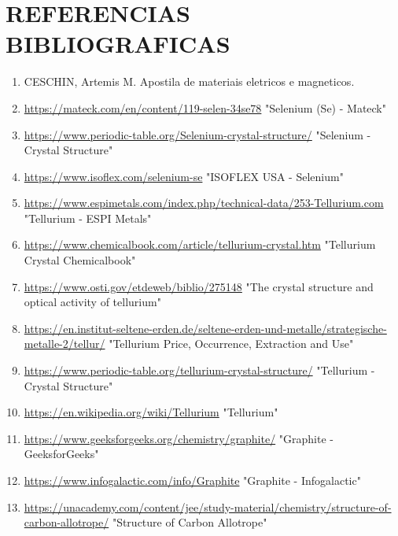 \documentclass[10pt,twocolumn,letterpaper]{article}
\begin{document}
\section{REFERENCIAS BIBLIOGRAFICAS}

\small
\begin{enumerate}
    \item CESCHIN, Artemis M. Apostila de materiais eletricos e magneticos.
    
    \item \url{https://mateck.com/en/content/119-selen-34se78} "Selenium (Se) - Mateck"
    
    \item \url{https://www.periodic-table.org/Selenium-crystal-structure/} "Selenium - Crystal Structure"
    
    \item \url{https://www.isoflex.com/selenium-se} "ISOFLEX USA - Selenium"
    
    \item \url{https://www.espimetals.com/index.php/technical-data/253-Tellurium.com} "Tellurium - ESPI Metals"
    
    \item \url{https://www.chemicalbook.com/article/tellurium-crystal.htm} "Tellurium Crystal Chemicalbook"
    
    \item \url{https://www.osti.gov/etdeweb/biblio/275148} "The crystal structure and optical activity of tellurium"
    
    \item \url{https://en.institut-seltene-erden.de/seltene-erden-und-metalle/strategische-metalle-2/tellur/} "Tellurium Price, Occurrence, Extraction and Use"
    
    \item \url{https://www.periodic-table.org/tellurium-crystal-structure/} "Tellurium - Crystal Structure"
    
    \item \url{https://en.wikipedia.org/wiki/Tellurium} "Tellurium"
    
    \item \url{https://www.geeksforgeeks.org/chemistry/graphite/} "Graphite - GeeksforGeeks"
    
    \item \url{https://www.infogalactic.com/info/Graphite} "Graphite - Infogalactic"
    
    \item \url{https://unacademy.com/content/jee/study-material/chemistry/structure-of-carbon-allotrope/} "Structure of Carbon Allotrope"
\end{enumerate}
\end{document}
